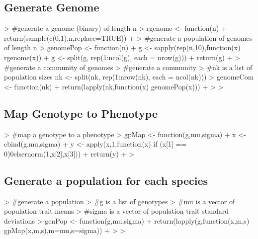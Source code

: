 \documentclass[12pt]{article}
\begin{document}
\subsection{Generate Genome}
\begin{Schunk}
\begin{Sinput}
>                                         #generate a genome (binary) of length n
> rgenome <- function(n){
+   return(sample(c(0,1),n,replace=TRUE))
+ }
>                                         #generate a population of genomes of length n
> genomePop <- function(n){
+ g <- sapply(rep(n,10),function(x) rgenome(x))
+ g <- split(g, rep(1:ncol(g), each = nrow(g)))
+ return(g)
+ }
>                                         #generate a community of genomes
>                                         #generate a community
>                                         #nk is a list of population sizes nk <- split(nk, rep(1:nrow(nk), each = ncol(nk)))
> genomeCom <- function(nk){
+   return(lapply(nk,function(x) genomePop(x)))
+ }
> 
> 
\end{Sinput}
\end{Schunk}

\subsection{Map Genotype to Phenotype}

\begin{Schunk}
\begin{Sinput}
>                                         #map a genotype to a phenotype
> gpMap <- function(g,mu,sigma){
+   x <- cbind(g,mu,sigma)
+   y <- apply(x,1,function(x) if (x[1] == 0){0}else{rnorm(1,x[2],x[3])})
+   return(y)
+ }
> 
\end{Sinput}
\end{Schunk}

\subsection{Generate a population for each species}

\begin{Schunk}
\begin{Sinput}
>                                         #generate a population
>                                         #g is a list of genotypes
>                                         #mu is a vector of population trait means
>                                         #sigma is a vector of population trait standard deviations
> genPop <- function(g,mu,sigma){
+   return(lapply(g,function(x,m,s) gpMap(x,m,s),m=mu,s=sigma))
+ }
> 
> 
\end{Sinput}
\end{Schunk}
\end{document}
